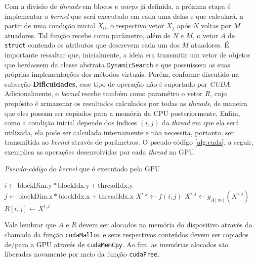 \documentclass[12pt]{article}
\begin{document}
Com a divisão de \textit{threads} em blocos e \textit{warps} já definida, a
próxima etapa é implementar o \textit{kernel} que será executado em cada uma
delas e que calculará, a partir de uma condição inicial \(X_0\), o respectivo
vetor \(X_f\) após \(N\) voltas por \(M\)
atuadores. Tal função recebe como parâmetro, além de \(N\) e \(M\), o vetor
\(A\) de \texttt{struct} contendo os atributos que descrevem cada um dos \(M\)
atuadores. É importante ressaltar que, inicialmente, a ideia era transmitir um
vetor de objetos que herdassem da classe abstrata \texttt{DynamicSearch} e que
possuíssem as suas próprias implementações dos métodos virtuais. Porém, conforme
discutido na subseção \textbf{Dificuldades}, esse tipo de operação não é
suportado por \textit{CUDA}. Adicionalmente, o \textit{kernel} recebe também
como paramêtro o vetor $R$, cujo propósito é armazenar os resultados calculados
por todas as \textit{threads}, de maneira que eles possam ser copiados para a
memória da CPU posteriormente. Enfim, como a condição inicial depende dos
índices \((i,j)\) da \textit{thread} em que ela será utilizada, ela pode ser
calculada internamente e não necessita, portanto, ser transmitida ao
\textit{kernel} através de parâmetros. O pseudo-código \ref{alg:cuda}, a seguir,
exemplica as operações desenvolvidas por cada \textit{thread} na GPU.


\begin{algorithm}
\caption{\label{alg:cuda} \textit{Pseudo-código} do \textit{kernel} que é
executado pela GPU} \begin{algorithmic}[1]
  	\State ${i} \gets \text{blockDim.y} * \text{blockIdx.y} + \text{threadIdx.y} $  
  	\State ${j} \gets \text{blockDim.x} * \text{blockIdx.x} + \text{threadIdx.x} $   
    \State ${X^{i,j}} \gets f(i,j) $ 
     
         
        	\State $X^{i,j} \gets g_{A[m]} (X^{i,j})$ 
    	\EndFor
    \EndFor
    \State ${R[i,j]} \gets X^{i,j} $ 
   \EndFunction

\end{algorithmic}
\end{algorithm}

Vale lembrar que \(A\) e \(R\) devem ser alocados na memória do dispositivo
através da chamada da função \texttt{cudaMalloc} e seus respectivos conteúdos
devem ser copiados de/para a GPU através de \texttt{cudaMemCpy}. Ao fim, as
memórias alocados são liberadas novamente por meio da função
\texttt{cudaFree}.
\end{document}
